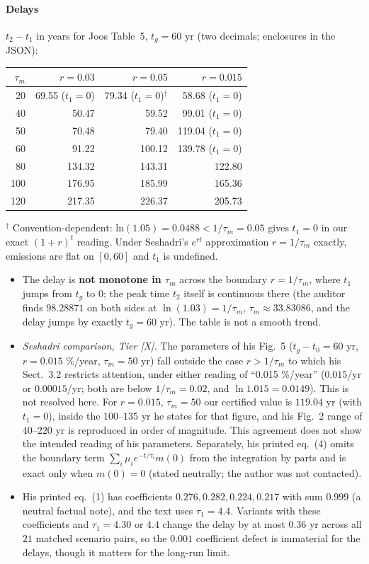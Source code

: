 \documentclass[10pt]{article}
\newcommand{\tier}[1]{\textsf{[#1]}}
\newcommand{\tX}{\tier{X}}
\theoremstyle{plain}
\begin{document}
\paragraph{Delays} $t_2-t_1$ in years for Joos Table~5, $t_g=60$ yr (two decimals; enclosures in the JSON):
\begin{center}\small\begin{tabular}{rrrr}\toprule
$\tau_m$ & $r=0.03$ & $r=0.05$ & $r=0.015$\\\midrule
20 & 69.55 ($t_1=0$) & 79.34 ($t_1=0$)$^\dagger$ & 58.68 ($t_1=0$)\\
40 & 50.47 & 59.52 & 99.01 ($t_1=0$)\\
50 & 70.48 & 79.40 & 119.04 ($t_1=0$)\\
60 & 91.22 & 100.12 & 139.78 ($t_1=0$)\\
80 & 134.32 & 143.31 & 122.80\\
100 & 176.95 & 185.99 & 165.36\\
120 & 217.35 & 226.37 & 205.73\\\bottomrule
\end{tabular}\end{center}
$^\dagger$ Convention-dependent: ln$(1.05)=0.0488<1/\tau_m=0.05$ gives $t_1=0$ in our exact $(1+r)^t$ reading. Under Seshadri's $e^{rt}$ approximation $r=1/\tau_m$ exactly, emissions are flat on $[0,60]$ and $t_1$ is undefined.
\begin{itemize}\itemsep=1pt
\item The delay is \textbf{not monotone in $\tau_m$} across the boundary $r=1/\tau_m$, where $t_1$ jumps from $t_g$ to $0$; the peak time $t_2$ itself is continuous there (the auditor finds $98.28871$ on both sides at $\ln(1.03)=1/\tau_m$, $\tau_m\approx33.83086$, and the delay jumps by exactly $t_g=60$ yr). The table is not a smooth trend.
\item \emph{Seshadri comparison, Tier \tX{}.} The parameters of his Fig.~5 ($t_g-t_0=60$ yr, $r=0.015$ \%/year, $\tau_m=50$ yr) fall outside the case $r>1/\tau_m$ to which his Sect.~3.2 restricts attention, under either reading of ``0.015 \%/year'' ($0.015$/yr or $0.00015$/yr; both are below $1/\tau_m=0.02$, and $\ln1.015=0.0149$). This is not resolved here. For $r=0.015$, $\tau_m=50$ our certified value is $119.04$ yr (with $t_1=0$), inside the $100$--$135$ yr he states for that figure, and his Fig.~2 range of $40$--$220$ yr is reproduced in order of magnitude. This agreement does not show the intended reading of his parameters. Separately, his printed eq.~(4) omits the boundary term $\sum_i\mu_ie^{-t/\tau_i}m(0)$ from the integration by parts and is exact only when $m(0)=0$ (stated neutrally; the author was not contacted).
\item His printed eq.~(1) has coefficients $0.276,0.282,0.224,0.217$ with sum $0.999$ (a neutral factual note), and the text uses $\tau_1=4.4$. Variants with these coefficients and $\tau_1=4.30$ or $4.4$ change the delay by at most $0.36$ yr across all $21$ matched scenario pairs, so the $0.001$ coefficient defect is immaterial for the delays, though it matters for the long-run limit.
\end{itemize}
\end{document}
